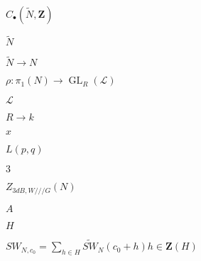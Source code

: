 \begin{preview}
\setcounter{equation}{0}%
\( C_{\bullet}( \widetilde{N} , \mathbf{Z}) \)
\end{preview}

\begin{preview}
\setcounter{equation}{0}%
\( \tilde{N} \)
\end{preview}

\begin{preview}
\setcounter{equation}{0}%
\( \tilde{N}\to N \)
\end{preview}

\begin{preview}
\setcounter{equation}{0}%
\( \rho: \pi_1(N) \to \operatorname{GL}_R(\mathcal{L}) \)
\end{preview}

\begin{preview}
\setcounter{equation}{0}%
\( \mathcal{L}  \)
\end{preview}

\begin{preview}
\setcounter{equation}{0}%
\( R \to k \)
\end{preview}

\begin{preview}
\setcounter{equation}{0}%
\(x\)
\end{preview}

\begin{preview}
\setcounter{equation}{0}%
\( L(p,q) \)
\end{preview}

\begin{preview}
\setcounter{equation}{0}%
\( 3 \)
\end{preview}

\begin{preview}
\setcounter{equation}{0}%
\( Z_{3dB, W / / / G} (N)\)
\end{preview}

\begin{preview}
\setcounter{equation}{0}%
\( A \)
\end{preview}

\begin{preview}
\setcounter{equation}{0}%
\( H \)
\end{preview}

\begin{preview}
\setcounter{equation}{0}%
\( SW_{N,c_0} = \sum_{h\in H}^{} \widetilde{SW}_N(c_{0 } + h)h \in \mathbf{Z} (H) \)
\end{preview}

